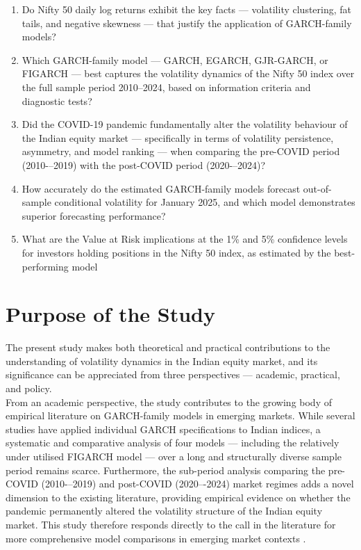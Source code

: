 \begin{enumerate}
\item Do Nifty 50 daily log returns exhibit the key facts — volatility clustering, fat tails, and negative skewness — that justify the application of GARCH-family models?
\item Which GARCH-family model — GARCH, EGARCH, GJR-GARCH, or FIGARCH — best captures the volatility dynamics of the Nifty 50 index over the full sample period 2010–2024, based on information criteria and diagnostic tests?
\item Did the COVID-19 pandemic fundamentally alter the volatility behaviour of the Indian equity market — specifically in terms of volatility persistence, asymmetry, and model ranking — when comparing the pre-COVID period (2010-–2019) with the post-COVID period (2020-–2024)?
\item How accurately do the estimated GARCH-family models forecast out-of-sample conditional volatility for January 2025, and which model demonstrates superior forecasting performance?
\item What are the Value at Risk implications at the 1\% and 5\% confidence levels for investors holding positions in the Nifty 50 index, as estimated by the best-performing model
\end{enumerate}


\section{Purpose of the Study}

The present study makes both theoretical and practical contributions to the understanding of volatility dynamics in the Indian equity market, and its significance can be appreciated from three perspectives — academic, practical, and policy.\\


From an academic perspective, the study contributes to the growing body of empirical literature on GARCH-family models in emerging markets. While several studies have applied individual GARCH specifications to Indian indices, a systematic and comparative analysis of four models — including the relatively under utilised FIGARCH model\citep{} — over a long and structurally diverse sample period remains scarce. Furthermore, the sub-period analysis comparing the pre-COVID (2010-–2019) and post-COVID (2020–-2024) market regimes adds a novel dimension to the existing literature, providing empirical evidence on whether the pandemic permanently altered the volatility structure of the Indian equity market. This study therefore responds directly to the call in the literature for more comprehensive model comparisons in emerging market contexts \citep{poon2003,mahajan2022}.\\



